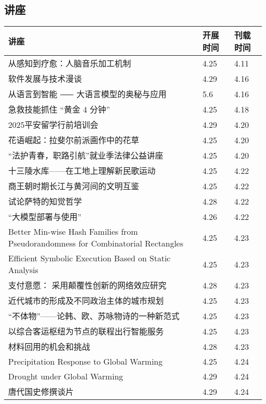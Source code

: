 \documentclass[letterpaper, 12pt]{article}
\begin{document}
\begin{multicols}{2}
\pagebreak

\section{讲座}
\begin{tabular}{|>{\centering\arraybackslash}m{}|m{}|m{}|}
    \hline
    讲座 & 开展时间 & 刊载时间\\
    \hline\hline
    从感知到疗愈：人脑音乐加工机制 & 4.25 & 4.11\\\hline
    软件发展与技术漫谈 & 4.29 & 4.16\\\hline
    从语言到智能 ⸺ 大语言模型的奥秘与应用 & 5.6 & 4.16\\\hline
    急救技能抓住 “黄金 4 分钟” & 4.25 & 4.18\\\hline
    2025平安留学行前培训会 & 4.29 & 4.20\\\hline
    花语崛起：拉斐尔前派画作中的花草 & 4.25 & 4.20\\\hline
    “法护青春，职路引航”就业季法律公益讲座 & 4.25 & 4.20\\\hline
    十三陵水库——在工地上理解新民歌运动 & 4.25 & 4.22\\\hline
    商王朝时期长江与黄河间的文明互鉴 & 4.25 & 4.22\\\hline
    试论萨特的知觉哲学 & 4.28 & 4.22\\\hline
    “大模型部署与使用” & 4.26 & 4.22\\\hline
    Better Min-wise Hash Families from Pseudorandomness for Combinatorial Rectangles & 4.25 & 4.23\\\hline
    Efficient Symbolic Execution Based on Static Analysis & 4.25 & 4.23\\\hline
    支付意愿： 采用颠覆性创新的网络效应研究 & 4.28 & 4.23\\\hline
    近代城市的形成及不同政治主体的城市规划 & 4.25 & 4.23\\\hline
    “不体物”——论韩、欧、苏咏物诗的一种新范式 & 4.25 & 4.23\\\hline
    以综合客运枢纽为节点的联程出行智能服务 & 4.25 & 4.23\\\hline
    材料回用的机会和挑战 & 4.28 & 4.23\\\hline
    Precipitation Response to Global Warming & 4.25 & 4.24\\\hline
    Drought under Global Warming & 4.29 & 4.24\\\hline
    唐代国史修撰谈片 & 4.29 & 4.24\\\hline
\end{tabular}

\end{multicols}
\end{document}
